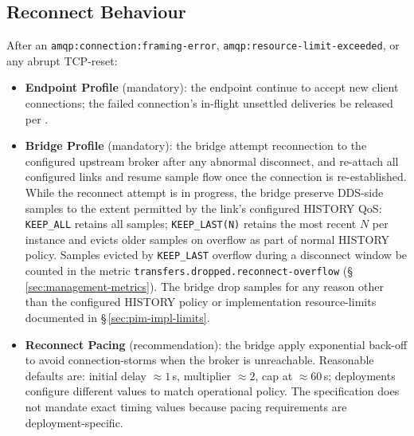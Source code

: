 \documentclass{../styles/zerodds-vendor-spec}
\begin{document}
\subsection{Reconnect Behaviour}\label{sec:reconnect}

After an \texttt{amqp:connection:framing-error},
\texttt{amqp:resource-limit-exceeded}, or any abrupt TCP-reset:

\begin{itemize}
  \item \textbf{Endpoint Profile} (mandatory): the endpoint
         continue to accept new client connections;
        the failed connection's in-flight unsettled deliveries
         be released per
        .
  \item \textbf{Bridge Profile} (mandatory): the bridge
         attempt reconnection to the configured
        upstream broker after any abnormal disconnect, and
         re-attach all configured links and resume
        sample flow once the connection is re-established. While
        the reconnect attempt is in progress, the bridge
         preserve DDS-side samples to the extent
        permitted by the link's configured HISTORY QoS:
        \texttt{KEEP\_ALL} retains all samples; \texttt{KEEP\_LAST(N)}
        retains the most recent $N$ per instance and evicts older
        samples on overflow as part of normal HISTORY policy.
        Samples evicted by \texttt{KEEP\_LAST} overflow during a
        disconnect window  be counted in the metric
        \texttt{transfers.dropped.reconnect-overflow}
        (\S\,\ref{sec:management-metrics}). The bridge
         drop samples for any reason other than
        the configured HISTORY policy or implementation
        resource-limits documented in \S\,\ref{sec:pim-impl-limits}.
  \item \textbf{Reconnect Pacing} (recommendation): the bridge
         apply exponential back-off to avoid
        connection-storms when the broker is unreachable.
        Reasonable defaults are: initial delay
        $\approx 1$\,s, multiplier $\approx 2$, cap at
        $\approx 60$\,s; deployments  configure
        different values to match operational policy. The
        specification does not mandate exact timing values
        because pacing requirements are deployment-specific.
\end{itemize}

\end{document}
